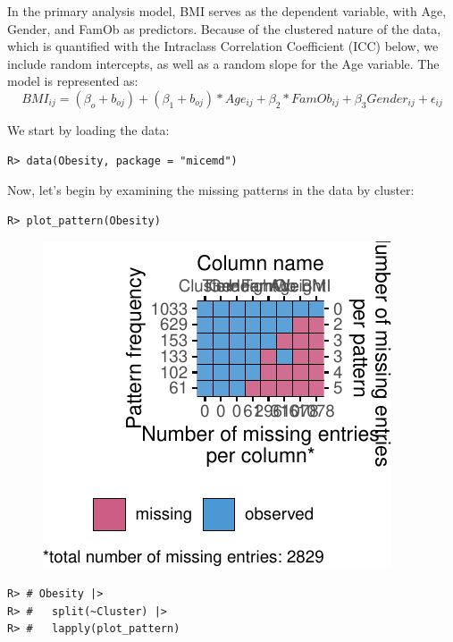 \documentclass[
  article]{jss}
\begin{document}
In the primary analysis model, BMI serves as the dependent variable,
with Age, Gender, and FamOb as predictors. Because of the clustered
nature of the data, which is quantified with the Intraclass Correlation
Coefficient (ICC) below, we include random intercepts, as well as a
random slope for the Age variable. The model is represented as:
\begin{equation}
\label{eqn:main}
BMI_{ij}= (\beta_{o}+ b_{oj} ) + (\beta_{1}+ b_{oj})* Age_{ij} + \beta_{2}*FamOb_{ij}+ \beta_{3}Gender_{ij} + \epsilon_{ij}
\end{equation}

We start by loading the data:

\begin{verbatim}
R> data(Obesity, package = "micemd")
\end{verbatim}

Now, let's begin by examining the missing patterns in the data by
cluster:

\begin{verbatim}
R> plot_pattern(Obesity)
\end{verbatim}

\begin{figure}[h]

{\centering \includegraphics{manuscript_files/figure-pdf/unnamed-chunk-47-1.pdf}

}

\end{figure}

\begin{verbatim}
R> # Obesity |> 
R> #   split(~Cluster) |>
R> #   lapply(plot_pattern)
\end{verbatim}
\end{document}
